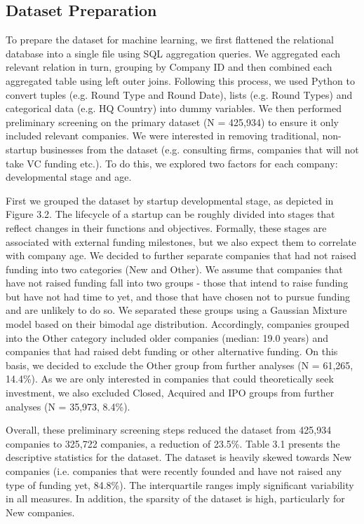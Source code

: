 \documentclass[../thesis/thesis.tex]{subfiles}
\begin{document}
\begin{enumerate}
\subsection{Dataset Preparation}

To prepare the dataset for machine learning, we first flattened the relational database into a single file using SQL aggregation queries. We aggregated each relevant relation in turn, grouping by Company ID and then combined each aggregated table using left outer joins. Following this process, we used Python to convert tuples (e.g. Round Type and Round Date), lists (e.g. Round Types) and categorical data (e.g. HQ Country) into dummy variables. We then performed preliminary screening on the primary dataset (N = 425,934) to ensure it only included relevant companies. We were interested in removing traditional, non-startup businesses from the dataset (e.g. consulting firms, companies that will not take VC funding etc.). To do this, we explored two factors for each company: developmental stage and age.

First we grouped the dataset by startup developmental stage, as depicted in Figure 3.2. The lifecycle of a startup can be roughly divided into stages that reflect changes in their functions and objectives. Formally, these stages are associated with external funding milestones, but we also expect them to correlate with company age. We decided to further separate companies that had not raised funding into two categories (New and Other). We assume that companies that have not raised funding fall into two groups - those that intend to raise funding but have not had time to yet, and those that have chosen not to pursue funding and are unlikely to do so. We separated these groups using a Gaussian Mixture model based on their bimodal age distribution. Accordingly, companies grouped into the Other category included older companies (median: 19.0 years) and companies that had raised debt funding or other alternative funding. On this basis, we decided to exclude the Other group from further analyses (N = 61,265, 14.4\%). As we are only interested in companies that could theoretically seek investment, we also excluded Closed, Acquired and IPO groups from further analyses (N = 35,973, 8.4\%).

Overall, these preliminary screening steps reduced the dataset from 425,934 companies to 325,722 companies, a reduction of 23.5\%. Table 3.1 presents the descriptive statistics for the dataset. The dataset is heavily skewed towards New companies (i.e. companies that were recently founded and have not raised any type of funding yet, 84.8\%). The interquartile ranges imply significant variability in all measures. In addition, the sparsity of the dataset is high, particularly for New companies.


\end{enumerate}
\end{document}
